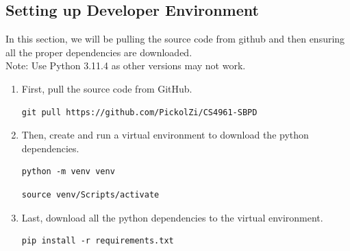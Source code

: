 \documentclass[12pt]{article}
\def\textit#1{#1}%
\begin{document}
\subsection{Setting up Developer Environment}
In this section, we will be pulling the source code from github and then ensuring all the proper dependencies are downloaded.
\\\textit{Note: Use Python 3.11.4 as other versions may not work.}
\begin{enumerate}
    \item First, pull the source code from GitHub.
        \begin{verbatim}git pull https://github.com/PickolZi/CS4961-SBPD\end{verbatim}
    \item Then, create and run a virtual environment to download the python dependencies.
        \begin{verbatim}python -m venv venv\end{verbatim}
        \begin{verbatim}source venv/Scripts/activate\end{verbatim}
    \item Last, download all the python dependencies to the virtual environment.
        \begin{verbatim}pip install -r requirements.txt\end{verbatim}
\end{enumerate}
\end{document}
